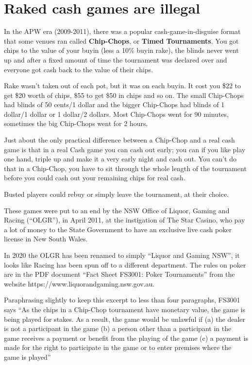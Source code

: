 \section{Raked cash games are illegal}

In the APW era (2009-2011), there was a popular
cash-game-in-disguise format that some venues ran
called \textbf{Chip-Chops}, or \textbf{Timed Tournaments}.
You got chips to the value of your buyin (less a 10\% buyin rake), the blinds
never went up and after a fixed amount of time the tournament was
declared over and everyone got cash back to the value of their chips.

Rake wasn't taken out of each pot, but it was on each buyin.
It cost you \$22 to get \$20 worth of chips, \$55 to get
\$50 in chips and so on. The small Chip-Chops had blinds of
50 cents/1 dollar and the bigger Chip-Chops had blinds of
1 dollar/1 dollar or 1 dollar/2 dollars. Most Chip-Chops went for 90
minutes, sometimes the big Chip-Chops went for 2 hours.

Just about the only practical difference between a
Chip-Chop and a real cash game is that in a real Cash game
you can cash out early; you can if you like play one hand,
triple up and make it a very early night and cash out.
You can't do that in a Chip-Chop, you have to sit through
the whole length of the tournament before you could cash out your
remaining chips for real cash.

Busted players could rebuy or simply leave the tournament,
at their choice.

These games were put to an end by the NSW Office of Liquor,
Gaming and Racing (``OLGR''), in April 2011, at the instigation of The
Star Casino, who pay a lot of money to the State Government to have an
exclusive live cash poker license in New South Wales.

In 2020 the OLGR has been renamed to simply
``Liquor and Gaming NSW'', it looks like Racing has been spun off to a
different department. The rules on poker are in
the PDF document ``Fact Sheet FS3001: Poker Tournaments'' from
the website https://www.liquorandgaming.nsw.gov.au.

Paraphrasing slightly to keep this excerpt to less than four paragraphs,
FS3001 says ``As the chips in a Chip-Chop tournament
have monetary value, the game is being played for stakes. As a result,
the game would be unlawful if (a) the dealer is not a participant in the game
(b) a person other than a participant in the game receives a payment
or benefit from the playing of the game (c) a payment is made for the
right to participate in the game or to enter premises where the game
is played''

